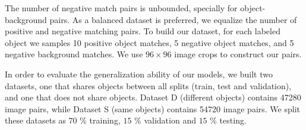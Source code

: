 The number of negative match pairs is unbounded, specially for object-background pairs. As a balanced dataset is preferred, we equalize the number of positive and negative matching pairs. To build our dataset, for each labeled object we samples 10 positive object matches, 5 negative object matches, and 5 negative background matches. We use $96 \times 96$ image crops to construct our pairs.

In order to evaluate the generalization ability of our models, we built two datasets, one that shares objects between all splits (train, test and validation), and one that does not share objects. Dataset D (different objects) contains 47280 image pairs, while Dataset S (same objects) contains 54720 image pairs. We split these datasets as $70$ \% training, $15 $ \% validation and $15$ \% testing.

